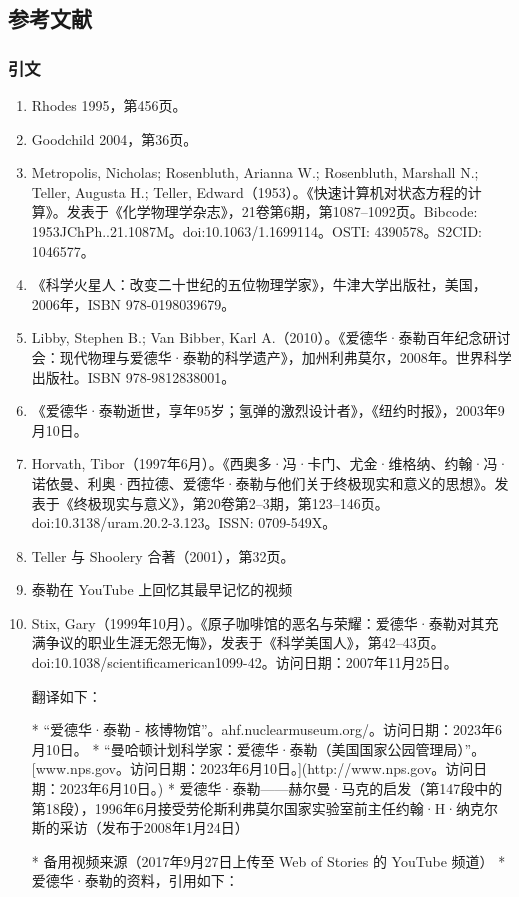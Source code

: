 \subsection{参考文献}
\subsubsection{引文}
\begin{enumerate}
\item Rhodes 1995，第456页。
\item Goodchild 2004，第36页。
\item Metropolis, Nicholas; Rosenbluth, Arianna W.; Rosenbluth, Marshall N.; Teller, Augusta H.; Teller, Edward（1953）。《快速计算机对状态方程的计算》。发表于《化学物理学杂志》，21卷第6期，第1087–1092页。Bibcode: 1953JChPh..21.1087M。doi:10.1063/1.1699114。OSTI: 4390578。S2CID: 1046577。
\item 《科学火星人：改变二十世纪的五位物理学家》，牛津大学出版社，美国，2006年，ISBN 978-0198039679。
\item Libby, Stephen B.; Van Bibber, Karl A.（2010）。《爱德华·泰勒百年纪念研讨会：现代物理与爱德华·泰勒的科学遗产》，加州利弗莫尔，2008年。世界科学出版社。ISBN 978-9812838001。
\item 《爱德华·泰勒逝世，享年95岁；氢弹的激烈设计者》，《纽约时报》，2003年9月10日。
\item Horvath, Tibor（1997年6月）。《西奥多·冯·卡门、尤金·维格纳、约翰·冯·诺依曼、利奥·西拉德、爱德华·泰勒与他们关于终极现实和意义的思想》。发表于《终极现实与意义》，第20卷第2–3期，第123–146页。doi:10.3138/uram.20.2-3.123。ISSN: 0709-549X。
\item Teller 与 Shoolery 合著（2001），第32页。
\item 泰勒在 YouTube 上回忆其最早记忆的视频
\item Stix, Gary（1999年10月）。《原子咖啡馆的恶名与荣耀：爱德华·泰勒对其充满争议的职业生涯无怨无悔》，发表于《科学美国人》，第42–43页。doi:10.1038/scientificamerican1099-42。访问日期：2007年11月25日。

翻译如下：

* “爱德华·泰勒 - 核博物馆”。ahf.nuclearmuseum.org/。访问日期：2023年6月10日。
* “曼哈顿计划科学家：爱德华·泰勒（美国国家公园管理局）”。[www.nps.gov。访问日期：2023年6月10日。](http://www.nps.gov。访问日期：2023年6月10日。)
* 爱德华·泰勒——赫尔曼·马克的启发（第147段中的第18段），1996年6月接受劳伦斯利弗莫尔国家实验室前主任约翰·H·纳克尔斯的采访（发布于2008年1月24日）

  * 备用视频来源（2017年9月27日上传至 Web of Stories 的 YouTube 频道）
* 爱德华·泰勒的资料，引用如下：


\end{enumerate}
